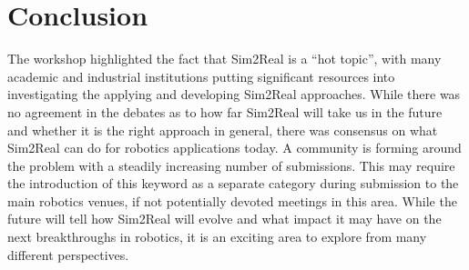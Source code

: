 





\section{Conclusion}

The workshop highlighted the fact that Sim2Real is a “hot topic”, with many academic and industrial institutions putting significant resources into  investigating the applying and developing Sim2Real approaches. While there was no agreement in the debates as to how far Sim2Real will take us in the future and whether it is the right approach in general, there was consensus on what Sim2Real can do for robotics applications today. A community is forming around the problem with a steadily increasing number of submissions. This may require the introduction of this keyword as a separate category during submission to the main robotics venues, if not potentially devoted meetings in this area. While the future will tell how Sim2Real will evolve and what impact it may have on the next breakthroughs in robotics, it is an exciting area to explore from many different perspectives. 